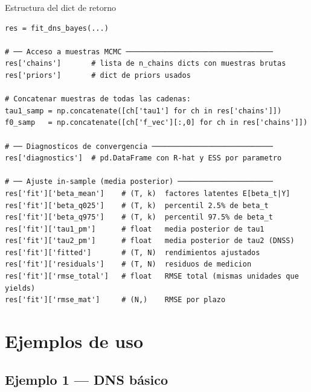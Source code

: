 \documentclass[12pt, a4paper]{article}
\theoremstyle{plain}
\theoremstyle{definition}
\theoremstyle{remark}
\begin{document}
\begin{codigocaja}{Estructura del dict de retorno}
\begin{lstlisting}
res = fit_dns_bayes(...)

# ── Acceso a muestras MCMC ──────────────────────────────────
res['chains']       # lista de n_chains dicts con muestras brutas
res['priors']       # dict de priors usados

# Concatenar muestras de todas las cadenas:
tau1_samp = np.concatenate([ch['tau1'] for ch in res['chains']])
f0_samp   = np.concatenate([ch['f_vec'][:,0] for ch in res['chains']])

# ── Diagnosticos de convergencia ────────────────────────────
res['diagnostics']  # pd.DataFrame con R-hat y ESS por parametro

# ── Ajuste in-sample (media posterior) ──────────────────────
res['fit']['beta_mean']    # (T, k)  factores latentes E[beta_t|Y]
res['fit']['beta_q025']    # (T, k)  percentil 2.5% de beta_t
res['fit']['beta_q975']    # (T, k)  percentil 97.5% de beta_t
res['fit']['tau1_pm']      # float   media posterior de tau1
res['fit']['tau2_pm']      # float   media posterior de tau2 (DNSS)
res['fit']['fitted']       # (T, N)  rendimientos ajustados
res['fit']['residuals']    # (T, N)  residuos de medicion
res['fit']['rmse_total']   # float   RMSE total (mismas unidades que yields)
res['fit']['rmse_mat']     # (N,)    RMSE por plazo
\end{lstlisting}
\end{codigocaja}

\section{Ejemplos de uso}

\subsection{Ejemplo 1 — DNS básico}
\end{document}
